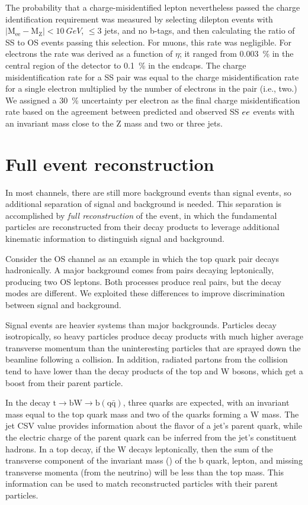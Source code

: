 The probability that a charge-misidentified lepton nevertheless passed the
charge identification requirement was measured by selecting dilepton events with
$|\text{M}_\text{ee} - \text{M}_\text{Z}| < \SI{10}{GeV}$, $\le3$ jets, and no
b-tags, and then calculating the ratio of SS to OS events passing this selection.
For muons, this rate was negligible. For electrons the rate was derived as a
function of $\eta$; it ranged from \SI{0.003}{\percent} in the central region of
the detector to \SI{0.1}{\percent} in the endcaps. The charge misidentification
rate for a SS pair was equal to the charge misidentification rate for a single
electron multiplied by the number of electrons in the pair (i.e., two.) We
assigned
a \SI{30}{\percent} uncertainty per electron as the final charge
misidentification rate based on the agreement between predicted and observed SS
$ee$ events with an invariant mass close to the Z mass and two or three
jets.

\section{Full event reconstruction}
In most channels, there are still more background events than signal events, so
additional separation of signal and background is needed. This separation is accomplished
by \emph{full reconstruction} of the event, in which the fundamental particles
are reconstructed from their decay products to leverage additional kinematic
information to distinguish signal and background.

Consider the OS \ttZ channel as an example in which the top quark pair decays
hadronically. A major background comes from \ttbar pairs decaying leptonically,
producing two OS leptons. Both processes produce real \ttbar pairs, but the
decay modes are different. We exploited these differences to improve
discrimination between signal and background.

Signal events are heavier systems than major backgrounds. Particles decay
isotropically, so heavy particles produce decay products with much higher
average transverse momentum than the uninteresting particles that are sprayed
down the beamline following a collision. In addition, radiated partons from the
collision tend to have lower \pT than the decay products of the top and W
bosons, which get a boost from their parent particle.

In the decay $\text{t} \rightarrow \text{b}\text{W} \rightarrow
\text{b}(\text{q}\bar{\text{q}})$, three quarks are expected, with an invariant
mass equal to the top quark mass and two of the quarks forming a W mass. The
jet CSV value provides information about the flavor of a jet's parent quark,
while the electric charge of the parent quark can be inferred from the jet's
constituent hadrons. In a top decay, if the W decays leptonically, then the sum
of the transverse component of the invariant mass (\MT) of the b quark, lepton,
and missing transverse momenta (from the neutrino) will be less than the top
mass. This information can be used to match reconstructed particles with their
parent particles.

